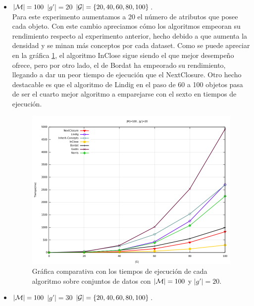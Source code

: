 \documentclass[oneside,openright,titlepage,numbers=noenddot,openany,headinclude,footinclude=true,
cleardoublepage=empty,abstractoff,BCOR=5mm,paper=a4,fontsize=12pt,main=spanish]{scrreprt}
\begin{document}
\begin{itemize}
\item \textbf{$|\mathcal{M}|=100$} \textbf{$|g'|=20$} \textbf{$|\mathcal{G}|=\{20,40,60,80,100\}$}.\\

Para este experimento aumentamos a 20 el número de atributos que posee cada objeto. Con este cambio apreciamos cómo los algoritmos empeoran su rendimiento respecto al experimento anterior, hecho debido a que aumenta la densidad y se minan más conceptos por cada dataset. Como se puede apreciar en la gráfica \ref{fig:m100g20g20100}, el algoritmo InClose sigue siendo el que mejor desempeño ofrece, pero por otro lado, el de Bordat ha empeorado su rendimiento, llegando a dar un peor tiempo de ejecución que el NextClosure. Otro hecho destacable es que el algoritmo de Lindig en el paso de 60 a 100 objetos pasa de ser el cuarto mejor algoritmo a emparejarse con el sexto en tiempos de ejecución.

\begin{figure}[H]
  \centering
  \includegraphics[scale=0.5]{images/M100g20G20100.png}
\caption{Gráfica comparativa con los tiempos de ejecución de cada algoritmo sobre conjuntos de datos con $|\mathcal{M}|=100$ y $|g'|=20$.}
  \label{fig:m100g20g20100}
\end{figure}


\item \textbf{$|\mathcal{M}|=100$} \textbf{$|g'|=30$} \textbf{$|\mathcal{G}|=\{20,40,60,80,100\}$}.\\


\end{itemize}
\end{document}
